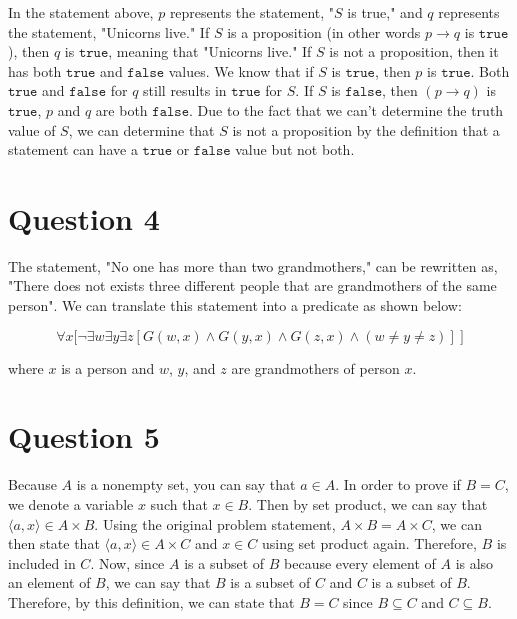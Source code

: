 \documentclass[letterpaper, 12pt]{article}
\begin{document}
In the statement above, $p$ represents the statement, "$S$ is true," and $q$ represents the statement, "Unicorns live." If $S$ is a proposition (in other words $p \to q$ is $\texttt{true}$), then $q$ is $\texttt{true}$, meaning that "Unicorns live." If $S$ is not a proposition, then it has both $\texttt{true}$ and $\texttt{false}$ values. We know that if $S$ is $\texttt{true}$, then $p$ is $\texttt{true}$. Both $\texttt{true}$ and $\texttt{false}$ for $q$ still results in $\texttt{true}$ for $S$. If $S$ is $\texttt{false}$, then $(p \to q)$ is $\texttt{true}$, $p$ and $q$ are both $\texttt{false}$. Due to the fact that we can't determine the truth value of $S$, we can determine that $S$ is not a proposition by the definition that a statement can have a $\texttt{true}$ or $\texttt{false}$ value but not both.

\section*{Question 4}
The statement, "No one has more than two grandmothers," can be rewritten as, "There does not exists three different people that are grandmothers of the same person". We can translate this statement into a predicate as shown below:

\[
\forall x \Bigg[ \neg \exists w \exists y \exists z [ G(w,x) \wedge G(y,x) \wedge G(z,x) \wedge (w \neq y \neq z)] \> \Bigg]
\]

where $x$ is a person and $w$, $y$, and $z$ are grandmothers of person $x$.

\section*{Question 5}
Because $A$ is a nonempty set, you can say that $a \in A$. In order to prove if $B = C$, we denote a variable $x$ such that $x \in B$. Then by set product, we can say that $\langle a,x \rangle \in A \times B$. Using the original problem statement, $A \times B = A \times C$, we can then state that $\langle a,x \rangle \in A \times C$ and $x \in C$ using set product again. Therefore, $B$ is included in $C$. Now, since $A$ is a subset of $B$ because every element of $A$ is also an element of $B$, we can say that $B$ is a subset of $C$ and $C$ is a subset of $B$. Therefore, by this definition, we can state that $B = C$ since $B \subseteq C$ and $C \subseteq B$.
\end{document}
